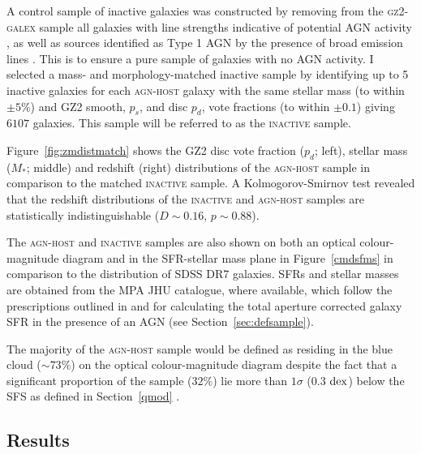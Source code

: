 A control sample of inactive galaxies was constructed by removing from the \textsc{gz2-galex} sample all galaxies with line strengths indicative of potential AGN activity \citep{kauffmann03b}, as well as sources identified as Type 1 AGN by the presence of broad emission lines \citep{Oh15}. This is to ensure a pure sample of galaxies with no AGN activity. I selected a mass- and morphology-matched inactive sample by identifying up to 5 inactive galaxies for each \textsc{agn-host} galaxy with the same stellar mass (to within $\pm5\%$) and GZ2 smooth, $p_s$, and disc $p_d$,  vote fractions (to within $\pm 0.1$) giving $6107$ galaxies. This sample will be referred to as the \textsc{inactive} sample. 


Figure~\ref{fig:zmdistmatch} shows the GZ2 disc vote fraction ($p_d$; left), stellar mass ($M_*$; middle) and redshift (right) distributions of the \textsc{agn-host} sample in comparison to the matched \textsc{inactive} sample. A Kolmogorov-Smirnov test revealed that the redshift distributions of the \textsc{inactive} and \textsc{agn-host} samples are statistically indistinguishable ($D \sim 0.16$, $p \sim 0.88$). 

The \textsc{agn-host} and \textsc{inactive}  samples are also shown on both an optical colour-magnitude diagram and in the SFR-stellar mass plane in Figure~\ref{cmdsfms} in comparison to the distribution of SDSS DR7 galaxies. SFRs and stellar masses are obtained from the MPA JHU catalogue, where available, which follow the prescriptions outlined in \cite{brinchmann04} and \cite{Salim07} for calculating the total aperture corrected galaxy SFR in the presence of an AGN (see Section~\ref{sec:defsample}). 

The majority of the \textsc{agn-host} sample would be defined as residing in the blue cloud ($\sim73\%$) on the optical colour-magnitude diagram despite the fact that a significant proportion of the sample ($32\%$) lie more than $1\sigma$ ($0.3$ $\rm{dex}$) below the SFS as defined in Section~\ref{qmod} \citep[][see Figure \ref{cmdsfms} and Table~\ref{table:agnqsubs}]{peng10}.

\subsection{Results}\label{results}


